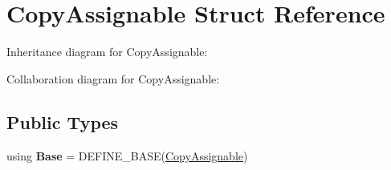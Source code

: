 \hypertarget{struct_copy_assignable}{}\section{Copy\+Assignable Struct Reference}
\label{struct_copy_assignable}


Inheritance diagram for Copy\+Assignable\+:


Collaboration diagram for Copy\+Assignable\+:
\subsection*{Public Types}
\begin{DoxyCompactItemize}
\item 
\mbox{\label{struct_copy_assignable_a1ad2c0771e3dc1260557fff8eae343e6}} 
using {\bfseries Base} = D\+E\+F\+I\+N\+E\+\_\+\+B\+A\+SE(\mbox{\hyperlink{struct_copy_assignable}{Copy\+Assignable}})
\end{DoxyCompactItemize}
